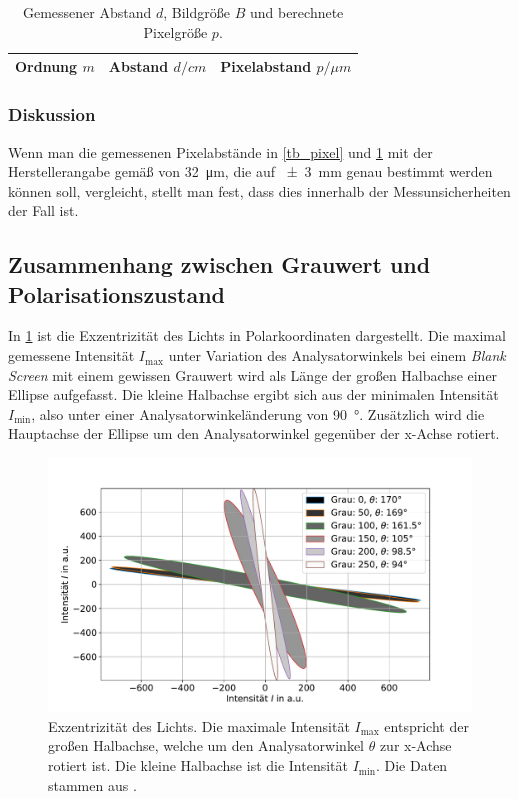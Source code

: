 \documentclass[
	a4paper,
	12pt,
	pagesize,
	ngerman
]{scrartcl}
\begin{document}
\begin{table}[H]
		\centering
		\begin{tabular}{ c | c | c }
			 Ordnung $m$ & Abstand $d/\si{cm}$ & Pixelabstand $p/\si{\mu m}$ \\ \hline
			 
		\end{tabular}
		\caption{
		Gemessener Abstand $d$, Bildgröße $B$ und berechnete Pixelgröße $p$.
		}
		\label{tb_gitter}
\end{table}
			\subsubsection*{Diskussion}
			Wenn man die gemessenen Pixelabstände in \cref{tb_pixel} und \cref{tb_gitter} mit der Herstellerangabe gemäß \cite{Handbuch} von \SI{32}{\micro \meter}, die auf \SI{\pm 3}{mm} genau bestimmt werden können soll, vergleicht, stellt man fest, dass dies innerhalb der Messunsicherheiten der Fall ist. %


		\subsection{Zusammenhang zwischen Grauwert und Polarisationszustand}
		In \cref{fig_ellipse} ist die Exzentrizität des Lichts in Polarkoordinaten dargestellt.
		Die maximal gemessene Intensität $I_\text{max}$ unter Variation des Analysatorwinkels bei einem \textit{Blank Screen} mit einem gewissen Grauwert wird als Länge der großen Halbachse einer Ellipse aufgefasst.
		Die kleine Halbachse ergibt sich aus der minimalen Intensität $I_\text{min}$, also unter einer Analysatorwinkeländerung von \SI{90}{\degree}.
		Zusätzlich wird die Hauptachse der Ellipse um den Analysatorwinkel gegenüber der x-Achse rotiert.


\begin{figure}[H]
			\includegraphics[width=1\linewidth]{img/ellipse}
			\caption{
			Exzentrizität des Lichts.
			Die maximale Intensität $I_\text{max}$ entspricht der großen Halbachse, welche um den Analysatorwinkel $\theta$ zur x-Achse rotiert ist.
			Die kleine Halbachse ist die Intensität $I_\text{min}$.
			Die Daten stammen aus \cite{JTZ}.
			}
			\label{fig_ellipse}
	\end{figure}
\end{document}
